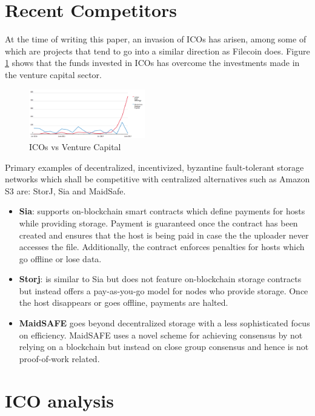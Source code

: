 \documentclass[conference]{IEEEtran}
\begin{document}
\section{Recent Competitors}
\label{sec:recent-competitors}
At the time of writing this paper, an invasion of ICOs has arisen, among some of which are projects that tend to go into a similar direction as Filecoin does.
Figure \ref{fig:ico-vs-venture} shows that the funds invested in ICOs has overcome the investments made in the venture capital sector.
\begin{figure}[h]
\centering
\includegraphics[width=0.45\textwidth]{ico-vs-venture}
\caption{ICOs vs Venture Capital \cite{ico-vs-venture}}
\label{fig:ico-vs-venture}
\end{figure}
Primary examples of decentralized, incentivized, byzantine fault-tolerant storage networks which shall be competitive with centralized alternatives such as Amazon S3\cite{amazon-s3} are: StorJ\cite{storj}, Sia\cite{sia} and MaidSafe\cite{maidsafe}.
\begin{itemize}
\item \textbf{Sia}: supports on-blockchain smart contracts which define payments for hosts while providing storage. 
Payment is guaranteed once the contract has been created and ensures that the host is being paid in case the the uploader never accesses the file. 
Additionally, the contract enforces penalties for hosts which go offline or lose data.
\item \textbf{Storj}: is similar to Sia but does not feature on-blockchain storage contracts but instead offers a pay-as-you-go model for nodes who provide storage. 
Once the host disappears or goes offline, payments are halted.
\item \textbf{MaidSAFE} goes beyond decentralized storage with a less sophisticated focus on efficiency.
MaidSAFE uses a novel scheme for achieving consensus by not relying on a blockchain but instead on close group consensus and hence is not proof-of-work related.

\end{itemize}

\section{ICO analysis}
\label{sec:ico-analysis}
\end{document}
